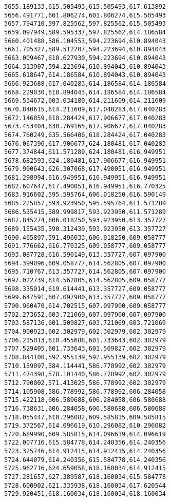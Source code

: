 \documentclass[11pt]{article}
\begin{document}
\begin{Verbatim}[commandchars=\\\{\}]
5655.189133,615.505493,615.505493,617.613892
5656.491771,601.806274,601.806274,615.505493
5657.794710,597.825562,597.825562,615.505493
5659.097949,589.595337,597.825562,614.186584
5660.401488,586.104553,594.223694,610.894043
5661.705327,589.512207,594.223694,610.894043
5663.009467,618.627930,594.223694,610.894043
5664.313907,594.223694,610.894043,610.894043
5665.618647,614.186584,610.894043,610.894043
5666.923688,617.040283,614.186584,614.186584
5668.229030,610.894043,614.186584,614.186584
5669.534672,603.034180,614.211609,614.211609
5670.840615,614.211609,617.040283,617.040283
5672.146859,618.284424,617.906677,617.040283
5673.453404,630.769165,617.906677,617.040283
5674.760249,635.566406,618.284424,617.040283
5676.067396,617.906677,624.180481,617.040283
5677.374844,611.571289,624.180481,616.949951
5678.682593,624.180481,617.906677,616.949951
5679.990643,626.307068,617.490051,616.949951
5681.298994,616.949951,616.949951,616.949951
5682.607647,617.490051,616.949951,616.770325
5683.916602,595.595764,606.018250,616.590149
5685.225857,593.923950,595.595764,611.571289
5686.535415,589.999817,593.923950,611.571289
5687.845274,606.018250,593.923950,613.357727
5689.155435,590.312439,593.923950,613.357727
5690.465897,591.496033,606.018250,609.058777
5691.776662,616.770325,609.058777,609.058777
5693.087728,616.590149,613.357727,607.097900
5694.399096,609.058777,614.562805,607.097900
5695.710767,613.357727,614.562805,607.097900
5697.022739,614.562805,614.562805,609.058777
5698.335014,619.614441,613.357727,609.058777
5699.647591,607.097900,613.357727,609.058777
5700.960470,614.702515,607.097900,609.058777
5702.273652,603.721069,607.097900,607.097900
5703.587136,601.509827,603.721069,603.721069
5704.900923,602.302979,602.302979,602.302979
5706.215013,610.455688,601.733643,602.302979
5707.529405,601.733643,601.509827,602.302979
5708.844100,592.955139,592.955139,602.302979
5710.159097,584.114441,586.778992,602.302979
5711.474398,578.101440,586.778992,602.302979
5712.790002,571.413025,586.778992,602.302979
5714.105908,586.778992,586.778992,606.284058
5715.422118,606.580688,606.284058,606.580688
5716.738631,606.284058,606.580688,606.580688
5718.055447,610.296082,609.585815,609.585815
5719.372567,614.096619,610.296082,610.296082
5720.689990,609.585815,614.096619,614.096619
5722.007716,615.584778,614.240356,614.240356
5723.325746,614.912415,614.912415,614.240356
5724.644079,614.240356,615.584778,614.240356
5725.962716,624.659058,618.160034,614.912415
5727.281657,627.389587,618.160034,615.584778
5728.600902,621.335938,618.160034,617.620544
5729.920451,618.160034,618.160034,618.160034

\end{Verbatim}
\end{document}
